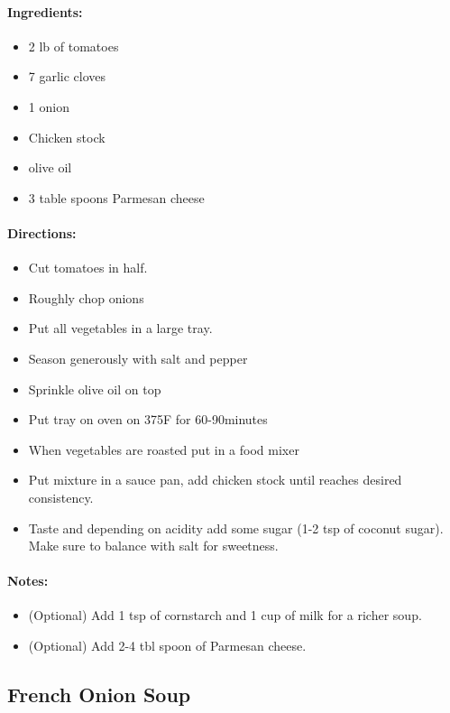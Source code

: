 \documentclass{article}
\begin{document}
\paragraph{Ingredients:}
\begin{itemize}
    \item 2 lb of tomatoes
    \item 7 garlic cloves
    \item 1 onion
    \item Chicken stock
    \item olive oil
    \item 3 table spoons Parmesan cheese
\end{itemize}

\paragraph{Directions:}
\begin{itemize}
    \item Cut tomatoes in half.
    \item Roughly chop onions
    \item Put all vegetables in a large tray.
    \item Season generously with salt and pepper
    \item Sprinkle olive oil on top
    \item Put tray on oven on 375F for 60-90minutes
    \item When vegetables are roasted put in a food mixer
    \item Put mixture in a sauce pan, add chicken stock until reaches desired consistency.
    \item Taste and depending on acidity add some sugar (1-2 tsp of coconut sugar). Make sure to balance with salt for sweetness.
\end{itemize}

\paragraph{Notes:}
\begin{itemize}
    \item (Optional) Add 1 tsp of cornstarch and 1 cup of milk for a richer soup.
    \item (Optional) Add 2-4 tbl spoon of Parmesan cheese.
\end{itemize}

\subsection{French Onion Soup}
\end{document}
